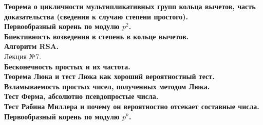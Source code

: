 \documentclass[12pt]{article}
\begin{document}
\textbf{Теорема о цикличности мультипликативных групп кольца вычетов, часть доказательства (сведения к случаю степени простого).}\\

\textbf{Первообразный корень по модулю $p^2$.}\\

\textbf{Биективность возведения в степень в кольце вычетов.}\\

\textbf{Алгоритм RSA.}\\

Лекция №7.\\
\textbf{Бесконечность простых и их частота.}\\

\textbf{Теорема Люка и тест Люка как хороший вероятностный тест.}\\

\textbf{Взламываемость простых чисел, полученных методом Люка.}\\

\textbf{Тест Ферма, абсолютно псевдопростые числа.}\\

\textbf{Тест Рабина Миллера и почему он вероятностно отсекает составные числа.}\\

\textbf{Первообразный корень по модулю $p^k$.}\\
\end{document}
